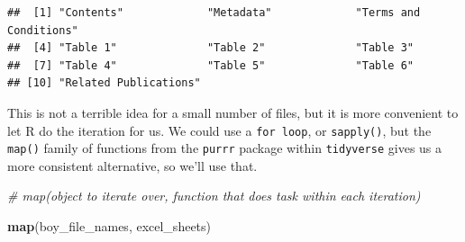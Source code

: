 \documentclass[]{book}
\newenvironment{Shaded}{\begin{snugshade}}{\end{snugshade}}
\newcommand{\CommentTok}[1]{\textcolor[rgb]{0.56,0.35,0.01}{\textit{#1}}}
\newcommand{\KeywordTok}[1]{\textcolor[rgb]{0.13,0.29,0.53}{\textbf{#1}}}
\newcommand{\NormalTok}[1]{#1}
\begin{document}
\begin{verbatim}
##  [1] "Contents"             "Metadata"             "Terms and Conditions"
##  [4] "Table 1"              "Table 2"              "Table 3"             
##  [7] "Table 4"              "Table 5"              "Table 6"             
## [10] "Related Publications"
\end{verbatim}

This is not a terrible idea for a small number of files, but it is
more convenient to let R do the iteration for us. We could use a \texttt{for\ loop},
or \texttt{sapply()}, but the \texttt{map()} family of functions from the \texttt{purrr}
package within \texttt{tidyverse} gives us a more consistent alternative,
so we'll use that.

\begin{Shaded}
\begin{Highlighting}[]
\CommentTok{# map(object to iterate over, function that does task within each iteration)}

\KeywordTok{map}\NormalTok{(boy_file_names, excel_sheets)}
\end{Highlighting}
\end{Shaded}
\end{document}
